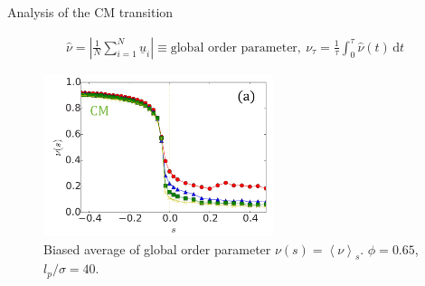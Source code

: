 \documentclass{beamer}
\begin{document}
\begin{frame}{Analysis of the CM transition}

\vspace{-10pt}
\begin{align*}
\hat{\nu} =\left|\frac{1}{N} \sum_{i=1}^N \underline{u}_i\right| \equiv \text{global order parameter},~ \nu_{\tau} = \frac{1}{\tau} \int_0^{\tau} \hat{\nu}(t) \, \text{d}t
\end{align*}

\begin{figure}
\centering
\includegraphics[width=0.60\textwidth]{Nemoto_2019_fig2a.png}
\caption{Biased average of global order parameter $\nu(s) = \left<\nu\right>_s$. $\phi = 0.65$, $l_p/\sigma = 40$. }
\end{figure}


\end{frame}
\end{document}
